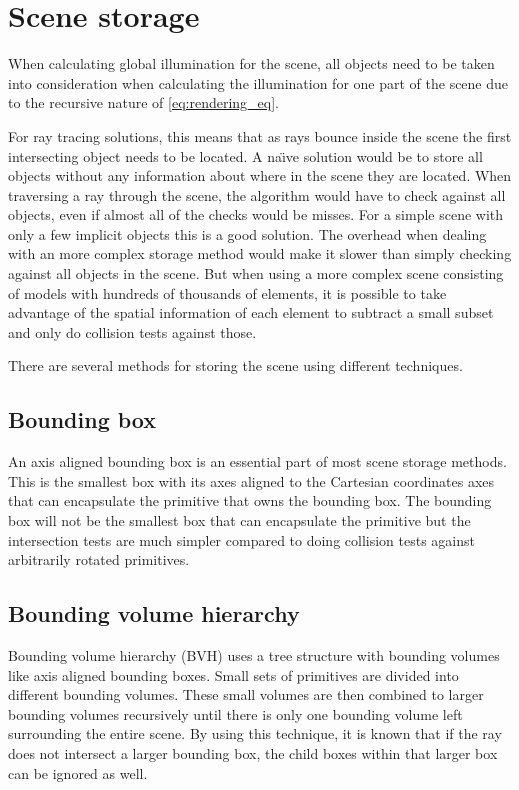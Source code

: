 \documentclass[a4paper, 12pt]{report}
\begin{document}
\section{Scene storage}
When calculating global illumination for the scene, all objects need to be taken into consideration when calculating the illumination for one part of the scene due to the recursive nature of \autoref{eq:rendering_eq}.

For ray tracing solutions, this means that as rays bounce inside the scene the first intersecting object needs to be located.
A na\"{\i}ve solution would be to store all objects without any information about where in the scene they are located.
When traversing a ray through the scene, the algorithm would have to check against all objects, even if almost all of the checks would be misses.
For a simple scene with only a few implicit objects this is a good solution. 
The overhead when dealing with an more complex storage method would make it slower than simply checking against all objects in the scene.
But when using a more complex scene consisting of models with hundreds of thousands of elements, it is possible to take advantage of the spatial information of each element to subtract a small subset and only do collision tests against those.

There are several methods for storing the scene using different techniques.

\subsection{Bounding box}
An axis aligned bounding box is an essential part of most scene storage methods.
This is the smallest box with its axes aligned to the Cartesian coordinates axes that can encapsulate the primitive that owns the bounding box.
The bounding box will not be the smallest box that can encapsulate the primitive but the intersection tests are much simpler compared to doing collision tests against arbitrarily rotated primitives.

\subsection{Bounding volume hierarchy}
Bounding volume hierarchy (BVH) uses a tree structure with bounding volumes like axis aligned bounding boxes. 
Small sets of primitives are divided into different bounding volumes.
These small volumes are then combined to larger bounding volumes recursively until there is only one bounding volume left surrounding the entire scene.
By using this technique, it is known that if the ray does not intersect a larger bounding box, the child boxes within that larger box can be ignored as well.
\end{document}
